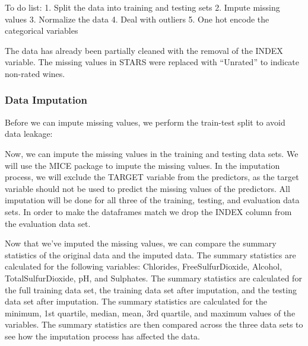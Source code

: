 \documentclass[
]{article}
\begin{document}
To do list: 1. Split the data into training and testing sets 2. Impute
missing values 3. Normalize the data 4. Deal with outliers 5. One hot
encode the categorical variables

The data has already been partially cleaned with the removal of the
INDEX variable. The missing values in STARS were replaced with
``Unrated'' to indicate non-rated wines.

\subsubsection{Data Imputation}\label{data-imputation}

Before we can impute missing values, we perform the train-test split to
avoid data leakage:

Now, we can impute the missing values in the training and testing data
sets. We will use the MICE package to impute the missing values. In the
imputation process, we will exclude the TARGET variable from the
predictors, as the target variable should not be used to predict the
missing values of the predictors. All imputation will be done for all
three of the training, testing, and evaluation data sets. In order to
make the dataframes match we drop the INDEX column from the evaluation
data set.

Now that we've imputed the missing values, we can compare the summary
statistics of the original data and the imputed data. The summary
statistics are calculated for the following variables: Chlorides,
FreeSulfurDioxide, Alcohol, TotalSulfurDioxide, pH, and Sulphates. The
summary statistics are calculated for the full training data set, the
training data set after imputation, and the testing data set after
imputation. The summary statistics are calculated for the minimum, 1st
quartile, median, mean, 3rd quartile, and maximum values of the
variables. The summary statistics are then compared across the three
data sets to see how the imputation process has affected the data.
\end{document}
